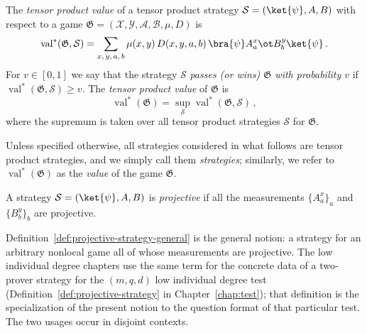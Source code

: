 \begin{definition}\label{def:tensor-product-value}
	The \emph{tensor product value} of a tensor product strategy $\mathcal S = (\ket{\psi}, A, B)$ with respect to a game $\mathfrak G = (\mathcal X, \mathcal Y, \mathcal A, \mathcal B, \mu, D)$ is
	\[
		\operatorname{val}^*(\mathfrak G, \mathcal S) = \sum_{x,\,y,\,a,\,b} \mu(x,y)\, D(x,y,a,b)\, \bra{\psi} A^x_a \ot B^y_b \ket{\psi}\,.
	\]
	For $v \in [0,1]$ we say that the strategy $\mathcal S$ \emph{passes (or wins) $\mathfrak G$ with probability $v$} if $\operatorname{val}^*(\mathfrak G, \mathcal S) \ge v$. The \emph{tensor product value} of $\mathfrak G$ is
	\[
		\operatorname{val}^*(\mathfrak G) = \sup_{\mathcal S} \operatorname{val}^*(\mathfrak G, \mathcal S)\,,
	\]
	where the supremum is taken over all tensor product strategies $\mathcal S$ for $\mathfrak G$.
\end{definition}

Unless specified otherwise, all strategies considered in what follows are tensor product strategies, and we simply call them \emph{strategies}; similarly, we refer to $\operatorname{val}^*(\mathfrak G)$ as the \emph{value} of the game $\mathfrak G$.

\begin{definition}\label{def:projective-strategy-general}
	\leanok
	A strategy $\mathcal S = (\ket{\psi}, A, B)$ is \emph{projective} if all the measurements $\{A^x_a\}_a$ and $\{B^y_b\}_b$ are projective.
\end{definition}

\begin{remark}\label{rem:projective-strategy-relation}
	Definition~\ref{def:projective-strategy-general} is the general notion: a strategy for an arbitrary nonlocal game all of whose measurements are projective. The low individual degree chapters use the same term for the concrete data of a two-prover strategy for the $(m,q,d)$ low individual degree test (Definition~\ref{def:projective-strategy} in Chapter~\ref{chap:test}); that definition is the specialization of the present notion to the question format of that particular test. The two usages occur in disjoint contexts.
\end{remark}

